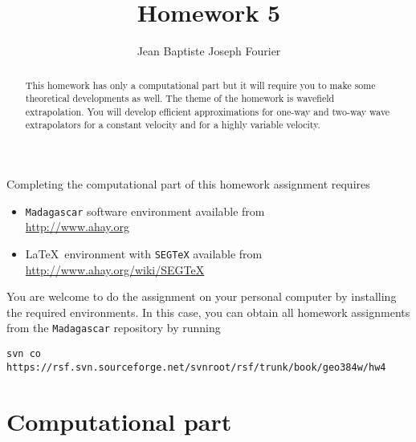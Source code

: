 \author{Jean Baptiste Joseph Fourier} 
\title{Homework 5}

\begin{abstract}
  This homework has only a computational part but it will require you
  to make some theoretical developments as well.  The theme of the
  homework is wavefield extrapolation. You will develop efficient
  approximations for one-way and two-way wave extrapolators for a
  constant velocity and for a highly variable velocity.
\end{abstract}

Completing the computational part of this homework assignment requires
\begin{itemize}
\item \texttt{Madagascar} software environment available from \\
  \url{http://www.ahay.org}
\item \LaTeX\ environment with \texttt{SEGTeX} available from \\ 
  \url{http://www.ahay.org/wiki/SEGTeX}
\end{itemize}

You are welcome to do the assignment on your personal computer by
installing the required environments. In this case, you can obtain all
homework assignments from the \texttt{Madagascar} repository by running
\begin{verbatim}
svn co https://rsf.svn.sourceforge.net/svnroot/rsf/trunk/book/geo384w/hw4 
\end{verbatim}

\section{Computational part}

